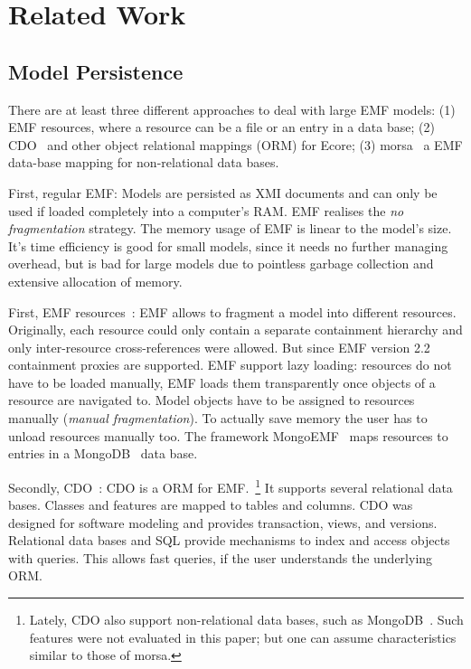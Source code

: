 \section{Related Work}
\label{sec:related_work}

\subsection{Model Persistence}
There are at least three different approaches to deal with large EMF models: (1) EMF resources, where a resource can be a file or an entry in a data base; (2) CDO~\cite{cdo} and other object relational mappings (ORM) for Ecore; (3) morsa~\cite{morsa2011} a EMF data-base mapping for non-relational data bases.

First, regular EMF: Models are persisted as XMI documents and can only be used if loaded completely into a computer's RAM. EMF realises the \emph{no fragmentation} strategy. The memory usage of EMF is linear to the model's size. It's time efficiency is good for small models, since it needs no further managing overhead, but is bad for large models due to pointless garbage collection and extensive allocation of memory.

First, EMF resources~\cite{emf2009}: EMF allows to fragment a model into different resources. Originally, each resource could only contain a separate containment hierarchy and only inter-resource cross-references were allowed. But since EMF version 2.2 containment proxies are supported. EMF support lazy loading: resources do not have to be loaded manually, EMF loads them transparently once objects of a resource are navigated to. Model objects have to be assigned to resources manually (\emph{manual fragmentation}). To actually save memory the user has to unload resources manually too. The framework MongoEMF~\cite{mongoEMF} maps resources to entries in a MongoDB~\cite{mongodb2010} data base.

Secondly, CDO~\cite{cdo}: CDO is a ORM for EMF.~\footnote{Lately, CDO also support non-relational data bases, such as MongoDB~\cite{mongodb2010}. Such features were not evaluated in this paper; but one can assume characteristics similar to those of morsa.}
It supports several relational data bases. Classes and features are mapped to tables and columns. CDO was designed for software modeling and provides transaction, views, and versions.
Relational data bases and SQL provide mechanisms to index and access objects with queries. This allows fast queries, if the user understands the underlying ORM.

